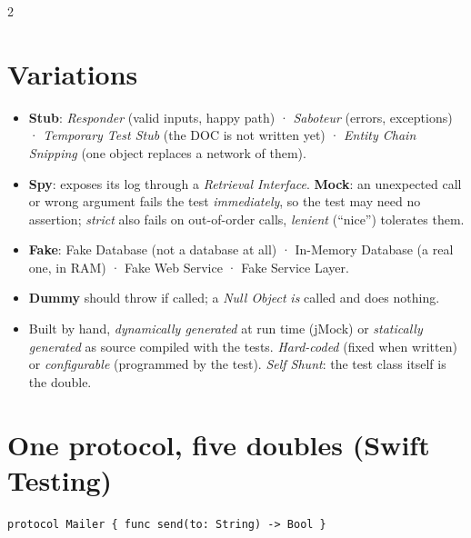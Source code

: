 \documentclass[8pt]{extarticle}
\begin{document}
\begin{multicols}{2}
\section{Variations}
\begin{itemize}
  \item \textbf{Stub}: \emph{Responder} (valid inputs, happy path) · \emph{Saboteur} (errors,
        exceptions) · \emph{Temporary Test Stub} (the DOC is not written yet) · \emph{Entity
        Chain Snipping} (one object replaces a network of them).
  \item \textbf{Spy}: exposes its log through a \emph{Retrieval Interface}. \textbf{Mock}: an
        unexpected call or wrong argument fails the test \emph{immediately}, so the test may need
        no assertion; \emph{strict} also fails on out-of-order calls, \emph{lenient} (``nice'')
        tolerates them.
  \item \textbf{Fake}: Fake Database (not a database at all) · In-Memory Database (a real one, in
        RAM) · Fake Web Service · Fake Service Layer.
  \item \textbf{Dummy} should throw if called; a \emph{Null Object} \emph{is} called and does
        nothing.
  \item Built by hand, \emph{dynamically generated} at run time (jMock) or \emph{statically
        generated} as source compiled with the tests. \emph{Hard-coded} (fixed when written) or
        \emph{configurable} (programmed by the test). \emph{Self Shunt}: the test class itself is
        the double.
\end{itemize}

\section{One protocol, five doubles (Swift Testing)}
\begin{lstlisting}[language=SwiftSheet]
protocol Mailer { func send(to: String) -> Bool }


\end{lstlisting}
\end{multicols}
\end{document}
